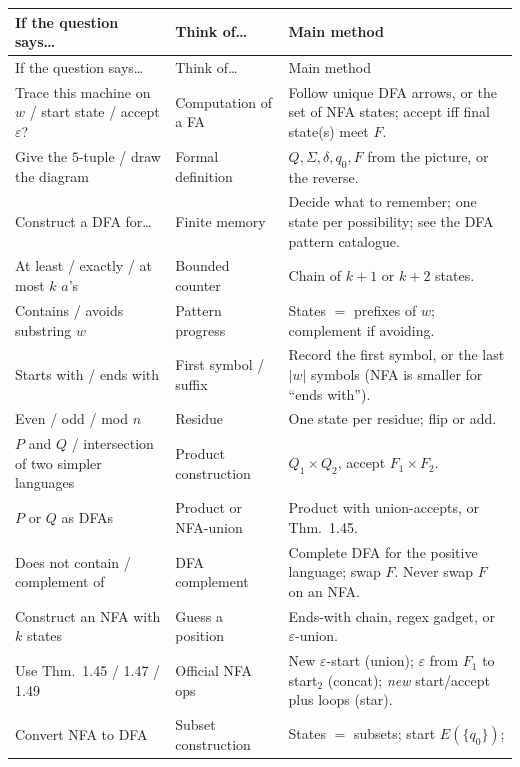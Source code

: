 \documentclass[11pt,a4paper]{article}
\newcommand{\eps}{\varepsilon}
\begin{document}
{\small
\begin{longtable}{@{}>{\raggedright\arraybackslash}p{}
                    >{\raggedright\arraybackslash}p{}
                    >{\raggedright\arraybackslash}p{}@{}}
\toprule
If the question says\ldots & Think of\ldots & Main method \\
\midrule
\endfirsthead
\toprule
If the question says\ldots & Think of\ldots & Main method \\
\midrule
\endhead
\bottomrule
\endfoot
Trace this machine on $w$ / start state / accept $\eps$?
  & Computation of a FA
  & Follow unique DFA arrows, or the set of NFA states;
    accept iff final state(s) meet $F$. \\
Give the $5$-tuple / draw the diagram
  & Formal definition
  & $Q,\Sigma,\delta,q_0,F$ from the picture, or the reverse. \\
Construct a DFA for\ldots
  & Finite memory
  & Decide what to remember; one state per possibility;
    see the DFA pattern catalogue. \\
At least / exactly / at most $k$ $a$'s
  & Bounded counter
  & Chain of $k{+}1$ or $k{+}2$ states. \\
Contains / avoids substring $w$
  & Pattern progress
  & States $=$ prefixes of $w$; complement if avoiding. \\
Starts with / ends with
  & First symbol / suffix
  & Record the first symbol, or the last $|w|$ symbols
    (NFA is smaller for ``ends with''). \\
Even / odd / mod $n$
  & Residue
  & One state per residue; flip or add. \\
$P$ and $Q$ / intersection of two simpler languages
  & Product construction
  & $Q_1\times Q_2$, accept $F_1\times F_2$. \\
$P$ or $Q$ as DFAs
  & Product or NFA-union
  & Product with union-accepts, or Thm.~1.45. \\
Does not contain / complement of
  & DFA complement
  & Complete DFA for the positive language; swap $F$.
    Never swap $F$ on an NFA. \\
Construct an NFA with $k$ states
  & Guess a position
  & Ends-with chain, regex gadget, or $\eps$-union. \\
Use Thm.~1.45 / 1.47 / 1.49
  & Official NFA ops
  & New $\eps$-start (union); $\eps$ from $F_1$ to start$_2$
    (concat); \emph{new} start/accept plus loops (star). \\
Convert NFA to DFA
  & Subset construction
  & States $=$ subsets; start $E(\{q_0\})$;

\end{longtable}}
\end{document}

